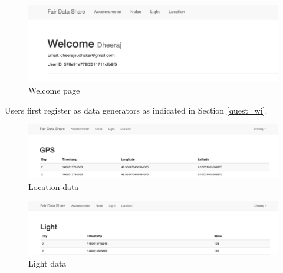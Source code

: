 \begin{figure}[ht!]
\centering
\includegraphics[width=\textwidth,keepaspectratio]{./images/fds_user_welcome}
\caption{Welcome page\label{fig:fdsdash}}
\end{figure}

Users first register as data generators as indicated in Section \ref{quest_wi}.

\begin{figure}[ht!]
\centering
\includegraphics[width=\textwidth,keepaspectratio]{./images/fds_user_gps_full}
\caption{Location data\label{fig:fdsgps}}
\end{figure}

\begin{figure}[ht!]
\centering
\includegraphics[width=\textwidth,keepaspectratio]{./images/fds_user_light_full}
\caption{Light data \label{fig:fdslight}}
\end{figure}


